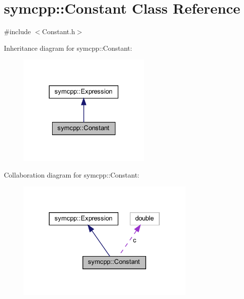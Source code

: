 \hypertarget{classsymcpp_1_1Constant}{}\section{symcpp\+::Constant Class Reference}
\label{classsymcpp_1_1Constant}


{\ttfamily \#include $<$Constant.\+h$>$}



Inheritance diagram for symcpp\+::Constant\+:
\nopagebreak
\begin{figure}[H]
\begin{center}
\leavevmode
\includegraphics[width=186pt]{classsymcpp_1_1Constant__inherit__graph}
\end{center}
\end{figure}


Collaboration diagram for symcpp\+::Constant\+:
\nopagebreak
\begin{figure}[H]
\begin{center}
\leavevmode
\includegraphics[width=250pt]{classsymcpp_1_1Constant__coll__graph}
\end{center}
\end{figure}
